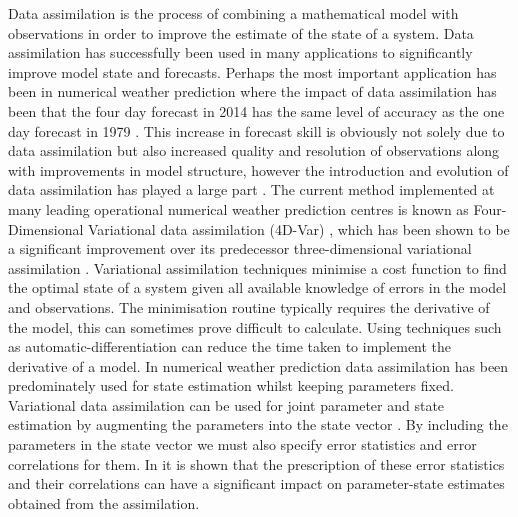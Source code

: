 \documentclass[11pt]{article}
\begin{document}
Data assimilation is the process of combining a mathematical model with observations in order to improve the estimate of the state of a system. Data assimilation has successfully been used in many applications to significantly improve model state and forecasts. Perhaps the most important application has been in numerical weather prediction where the impact of data assimilation has been that the four day forecast in 2014 has the same level of accuracy as the one day forecast in 1979 \citep{bauer2015quiet}. This increase in forecast skill is obviously not solely due to data assimilation but also increased quality and resolution of observations along with improvements in model structure, however the introduction and evolution of data assimilation has played a large part \citep{dee2011era}. The current method implemented at many leading operational numerical weather prediction centres is known as Four-Dimensional Variational data assimilation (4D-Var) \citep{rabier2000ecmwf, rawlins2007met}, which has been shown to be a significant improvement over its predecessor three-dimensional variational assimilation \citep{lorenc2005does}. Variational assimilation techniques minimise a cost function to find the optimal state of a system given all available knowledge of errors in the model and observations. The minimisation routine typically requires the derivative of the model, this can sometimes prove difficult to calculate. Using techniques such as automatic-differentiation can reduce the time taken to implement the derivative of a model. In numerical weather prediction data assimilation has been predominately used for state estimation whilst keeping parameters fixed. Variational data assimilation can be used for joint parameter and state estimation by augmenting the parameters into the state vector \citep{navon1998practical}. By including the parameters in the state vector we must also specify error statistics and error correlations for them. In \citet{smith2009variational} it is shown that the prescription of these error statistics and their correlations can have a significant impact on parameter-state estimates obtained from the assimilation.
\end{document}
